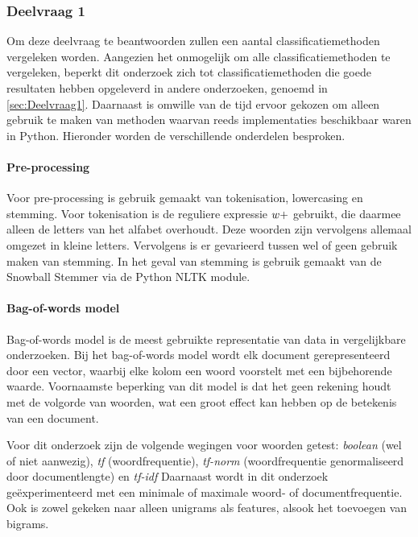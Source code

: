 \subsubsection{Deelvraag 1}

Om deze deelvraag te beantwoorden zullen een aantal classificatiemethoden vergeleken worden. Aangezien het onmogelijk om alle classificatiemethoden te vergeleken, beperkt dit onderzoek zich tot classificatiemethoden die goede resultaten hebben opgeleverd in andere onderzoeken, genoemd in \ref{sec:Deelvraag1}. Daarnaast is omwille van de tijd ervoor gekozen om alleen gebruik te maken van methoden waarvan reeds implementaties beschikbaar waren in Python. Hieronder worden de verschillende onderdelen besproken.

\paragraph{Pre-processing}
Voor pre-processing is gebruik gemaakt van tokenisation, lowercasing en stemming. Voor tokenisation is de reguliere expressie $\\w+$ gebruikt, die daarmee alleen de letters van het alfabet overhoudt. Deze woorden zijn vervolgens allemaal omgezet in kleine letters. Vervolgens is er gevarieerd tussen wel of geen gebruik maken van stemming. In het geval van stemming is gebruik gemaakt van de Snowball Stemmer via de Python NLTK module.

\paragraph{Bag-of-words model}
Bag-of-words model is de meest gebruikte representatie van data in vergelijkbare onderzoeken. Bij het bag-of-words model wordt elk document gerepresenteerd door een vector, waarbij elke kolom een woord voorstelt met een bijbehorende waarde. Voornaamste beperking van dit model is dat het geen rekening houdt met de volgorde van woorden, wat een groot effect kan hebben op de betekenis van een document.\par
Voor dit onderzoek zijn de volgende wegingen voor woorden getest: \textit{boolean} (wel of niet aanwezig), \textit{tf} (woordfrequentie), \textit{tf-norm} (woordfrequentie genormaliseerd door documentlengte) en \textit{tf-idf}
Daarnaast wordt in dit onderzoek geëxperimenteerd met een minimale of maximale woord- of documentfrequentie. Ook is zowel gekeken naar alleen unigrams als features, alsook het toevoegen van bigrams.\par

